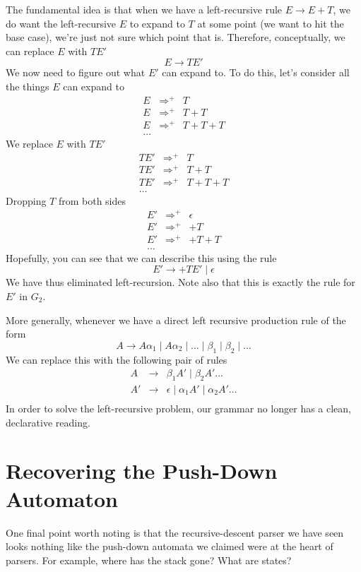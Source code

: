The fundamental idea is that when we have a left-recursive rule $E \to E + T$, we do want the left-recursive $E$ to expand to $T$ at some point (we want to hit the base case), we're just not sure which point that is. Therefore, conceptually, we can replace $E$ with $T E'$
\[ E \to T E' \]
We now need to figure out what $E'$ can expand to. To do this, let's consider all the things $E$ can expand to
\[
\begin{array}{rcl}
   E&\Rightarrow^{+}&T\\
   E&\Rightarrow^{+}&T+T\\
   E&\Rightarrow^{+}&T+T+T\\
   \ldots&
\end{array}
\]
We replace $E$ with $TE'$
\[
\begin{array}{rcl}
   TE'&\Rightarrow^{+}&T\\
   TE'&\Rightarrow^{+}&T+T\\
   TE'&\Rightarrow^{+}&T+T+T\\
   \ldots&
\end{array}
\]
Dropping $T$ from both sides
\[
\begin{array}{rcl}
   E'&\Rightarrow^{+}&\epsilon\\
   E'&\Rightarrow^{+}&+T\\
   E'&\Rightarrow^{+}&+T+T\\
   \ldots&
\end{array}
\]
Hopefully, you can see that we can describe this using the rule
\[ E' \rightarrow +TE' \mid \epsilon \]
We have thus eliminated left-recursion. Note also that this is exactly the rule for $E'$ in $G_2$.

More generally, whenever we have a direct left recursive production rule of the form
\[ A \rightarrow A\alpha_1 \mid A\alpha_2 \mid \ldots \mid \beta_1 \mid \beta_2 \mid \ldots \]
We can replace this with the following pair of rules
\[
\begin{array}{rcl}
   A&\rightarrow&\beta_1A' \mid \beta_2A' \ldots \\
   A'&\rightarrow&\epsilon \mid \alpha_1A' \mid \alpha_2A' \ldots \\
\end{array}
\]
In order to solve the left-recursive problem, our grammar no longer has a clean, declarative reading.

\section{Recovering the Push-Down Automaton}
One final point worth noting is that the recursive-descent parser we have seen looks nothing like the push-down automata we claimed were at the heart of parsers. For example, where has the stack gone? What are states?

